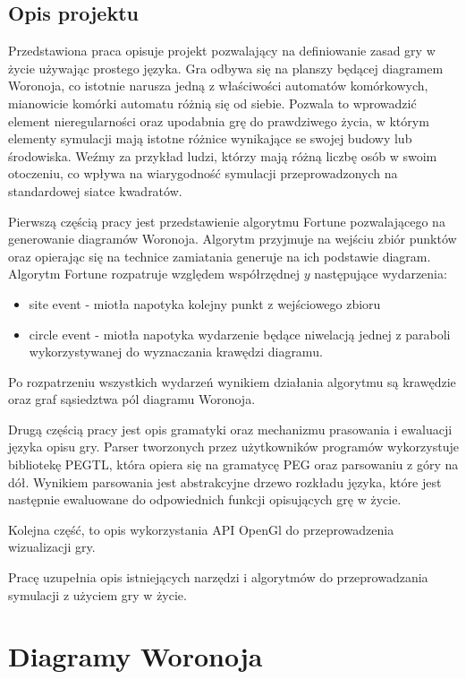 \documentclass[declaration,shortabstract, inz]{iithesis}
\theoremstyle{definition} \newtheorem{definition}{Definicja}[]
\theoremstyle{plain} \newtheorem{remark}[definition]{Obserwacja}
\theoremstyle{plain} \newtheorem{theorem}[definition]{Twierdzenie}
\theoremstyle{plain} \newtheorem{example}{Przykład}[definition]
\theoremstyle{plain} \newtheorem{lemma}[definition]{Lemat}
\begin{document}
\section{Opis projektu}

Przedstawiona praca opisuje projekt pozwalający na definiowanie zasad gry w życie używając prostego języka. Gra odbywa się na planszy będącej diagramem Woronoja, co istotnie narusza jedną z właściwości automatów komórkowych, mianowicie komórki automatu różnią się od siebie. Pozwala to wprowadzić element nieregularności oraz upodabnia grę do prawdziwego życia, w którym elementy symulacji mają istotne różnice wynikające se swojej budowy lub środowiska.
Weźmy za przykład ludzi, którzy mają różną liczbę osób w swoim otoczeniu, co wpływa na wiarygodność symulacji przeprowadzonych na standardowej siatce kwadratów.

Pierwszą częścią pracy jest przedstawienie algorytmu Fortune pozwalającego na generowanie diagramów Woronoja. Algorytm przyjmuje na wejściu zbiór punktów oraz opierając się na technice zamiatania generuje na ich podstawie diagram.
Algorytm Fortune rozpatruje względem współrzędnej $y$ następujące wydarzenia:
\begin{itemize}
	\item site event - miotła napotyka kolejny punkt z wejściowego zbioru
	\item circle event - miotła napotyka wydarzenie będące niwelacją jednej z paraboli wykorzystywanej do wyznaczania krawędzi diagramu.
\end{itemize}
Po rozpatrzeniu wszystkich wydarzeń wynikiem działania algorytmu są krawędzie oraz graf sąsiedztwa pól diagramu Woronoja.

Drugą częścią pracy jest opis gramatyki oraz mechanizmu prasowania i ewaluacji języka opisu gry. Parser tworzonych przez użytkowników programów wykorzystuje bibliotekę PEGTL, która opiera się na gramatycę PEG oraz parsowaniu z góry na dół. Wynikiem parsowania jest abstrakcyjne drzewo rozkładu języka, które jest następnie ewaluowane do odpowiednich funkcji opisujących grę w życie.

Kolejna część, to opis wykorzystania API OpenGl do przeprowadzenia wizualizacji gry.

Pracę uzupełnia opis istniejących narzędzi i algorytmów do przeprowadzania symulacji z użyciem gry w życie.

\chapter{Diagramy Woronoja}
\end{document}
